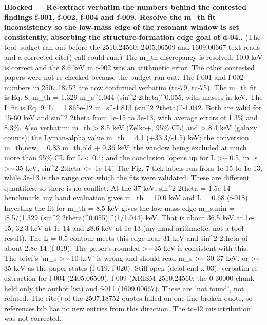 \documentclass[11pt,a4paper]{article}
\begin{document}
\textbf{Blocked --- Re-extract verbatim the numbers behind the contested findings f-001, f-002, f-004 and f-009. Resolve the m\_th fit inconsistency so the low-mass edge of the resonant window is set consistently, absorbing the structure-formation edge goal of d-04..} (The tool budget ran out before the 2510.24560, 2405.06509 and 1609.00667 text reads and a corrected cite() call could run.) The m\_th discrepancy is resolved: 10.0 keV is correct and the 8.6 keV in f-002 was an arithmetic error. The other contested papers were not re-checked because the budget ran out. The f-001 and f-002 numbers in 2507.18752 are now confirmed verbatim (tc-79, tc-75). The m\_th fit is Eq. 8: m\_th = 1.329 m\_s\textasciicircum{}1.044 (sin\textasciicircum{}2 2theta)\textasciicircum{}0.055, with masses in keV. The L fit is Eq. 9: L = 1.865e-12 m\_s\textasciicircum{}-1.813 (sin\textasciicircum{}2 2theta)\textasciicircum{}-1.042. Both are valid for 15-60 keV and sin\textasciicircum{}2 2theta from 1e-15 to 3e-13, with average errors of 1.3\% and 8.3\%. Also verbatim: m\_th \textgreater{} 8.5 keV (Zelko+, 95\% CL) and \textgreater{} 8.4 keV (galaxy counts); the Lyman-alpha value m\_th = 4.1 (+33.3/-1.5) keV; the conversion m\_th,new = 0.83 m\_th,old + 0.36 keV; the window being excluded at much more than 95\% CL for L \textless{} 0.1; and the conclusion 'opens up for L \textgreater{}\textasciitilde{} 0.5, m\_s \textgreater{}\textasciitilde{} 35 keV, sin\textasciicircum{}2 2theta \textless{}\textasciitilde{} 1e-14'. The Fig. 7 tick labels run from 1e-15 to 1e-13, while 3e-13 is the range over which the fits were validated. These are different quantities, so there is no conflict. At the 37 keV, sin\textasciicircum{}2 2theta = 1.5e-14 benchmark, my hand evaluation gives m\_th = 10.0 keV and L = 0.68 (f-018). Inverting the fit for m\_th = 8.5 keV gives the low-mass edge m\_s,min = [8.5/(1.329 (sin\textasciicircum{}2 2theta)\textasciicircum{}0.055)]\textasciicircum{}(1/1.044) keV. That is about 36.5 keV at 1e-15, 32.3 keV at 1e-14 and 28.6 keV at 1e-13 (my hand arithmetic, not a tool result). The L = 0.5 contour meets this edge near 31 keV and sin\textasciicircum{}2 2theta of about 2.8e-14 (f-019). The paper's rounded \textgreater{}\textasciitilde{} 35 keV is consistent with this. The brief's 'm\_s \textgreater{}\textasciitilde{} 10 keV' is wrong and should read m\_s \textgreater{}\textasciitilde{} 30-37 keV, or \textgreater{}\textasciitilde{} 35 keV as the paper states (f-019, f-020). Still open (dead end x-03): verbatim re-extraction for f-004 (2405.06509), f-009 (XRISM 2510.24560; the 0-30000 chunk held only the author list) and f-011 (1609.00667). These are 'not found', not refuted. The cite() of the 2507.18752 quotes failed on one line-broken quote, so references.bib has no new entries from this direction. The tc-42 misattribution was not corrected.
\end{document}
